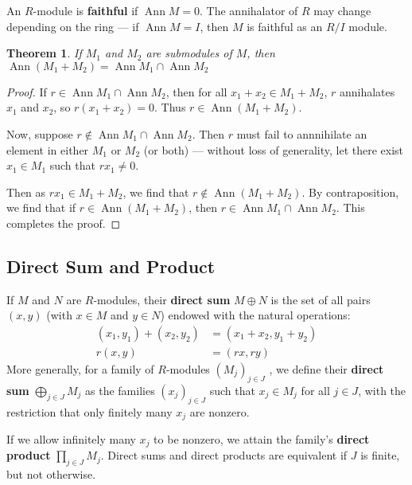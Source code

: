 \documentclass[11pt]{article}
\newtheorem{theorem}{Theorem}
\newcommand{\Ann}{\operatorname{Ann}}
\begin{document}
An $R$-module is \textbf{faithful} if $\Ann M = 0$. The annihalator of $R$ may change depending on the ring --- if $\Ann M = I$, then $M$ is faithful as an $R / I$ module.

\begin{adjustwidth}{1cm}{}
	\begin{theorem}
		If $M_{1}$ and $M_{2}$ are submodules of $M$, then $\Ann(M_{1} + M_{2}) = \Ann M_{1} \cap \Ann M_{2}$
	\end{theorem}
	\begin{proof}
		If $r \in \Ann M_{1} \cap \Ann M_{2} $, then for all $x_{1} + x_{2} \in M_{1} + M_{2}$, $r$ annihalates $x_{1}$ and $x_{2}$, so $r(x_{1} + x_{2}) = 0.$ Thus $r \in \Ann(M_{1} + M_{2})$.

		Now, suppose $r \notin \Ann M_{1} \cap \Ann M_{2} $. Then $r$ must fail to annnihilate an element in either $M_{1}$ or $M_{2}$ (or both) --- without loss of generality, let there exist $x_{1} \in M_{1}$ such that $rx_{1} \ne 0$.

		Then as $rx_{1} \in M_{1} + M_{2}$, we find that $r \notin \Ann(M_{1} + M_{2})$. By contraposition, we find that if $r \in \Ann(M_{1} + M_{2})$, then $r \in \Ann M_{1} \cap \Ann M_{2}$. This completes the proof.
	\end{proof}
\end{adjustwidth}


\subsection{Direct Sum and Product}

If $M$ and $N$ are $R$-modules, their \textbf{direct sum} $M \oplus N$ is the set of all pairs $(x, y)$ (with $x \in M$ and $y \in N$) endowed with the natural operations:
\begin{align*}
	(x_{1}, y_{1}) + (x_{2}, y_{2}) & = (x_{1} + x_{2}, y_{1} + y_{2}) \\
	r(x, y)                         & = (rx, ry)
\end{align*}
More generally, for a family of $R$-modules $(M_{j})_{j \in J}$ , we define their \textbf{direct sum} $\bigoplus_{j \in J} M_{j}$ as the families $(x_{j})_{j \in J}$ such that $x_{j} \in M_{j}$ for all $j \in J$, with the restriction that only finitely many $x_{j}$ are nonzero.

If we allow infinitely many $x_{j}$ to be nonzero, we attain the family's \textbf{direct product} $\prod_{j \in J} M_{j}$. Direct sums and direct products are equivalent if $J$ is finite, but not otherwise.
\end{document}
